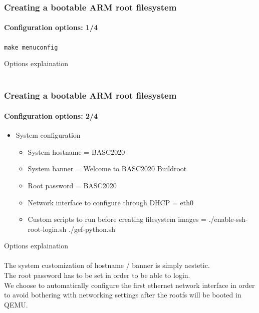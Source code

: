 \begin{frame}
  \frametitle{Creating a bootable ARM root filesystem}
  \framesubtitle{Configuration options: 1/4}
  \texttt{make menuconfig}
  \begin{itemize}
    \targetOptionsList
    \buildOptionsList
  \end{itemize}
\end{frame}
 {
  Options explaination \\
  \targetOptionsDescription \\
  \buildOptionsDescription
}

\begin{frame}
  \frametitle{Creating a bootable ARM root filesystem}
  \framesubtitle{Configuration options: 2/4}
  \begin{itemize}
    \toolchainOptionsList
    \item System configuration
    \begin{itemize}
      \item System hostname = BASC2020
      \item System banner = Welcome to BASC2020 Buildroot
      \item Root password = BASC2020
      \item Network interface to configure through DHCP = eth0
      \item Custom scripts to run before creating filesystem images = ./enable-ssh-root-login.sh ./gef-python.sh
    \end{itemize}
  \end{itemize}
\end{frame}
 {
  Options explaination \\
  \toolchainOptionsDescription \\
  The system customization of hostname / banner is simply aestetic. \\
  The root password has to be set in order to be able to login. \\
  We choose to automatically configure the first ethernet network interface in order to avoid bothering with networking settings after the rootfs will be booted in QEMU. \\
  \sshRootLoginDescription \\
  \gefPythonDescription
}

